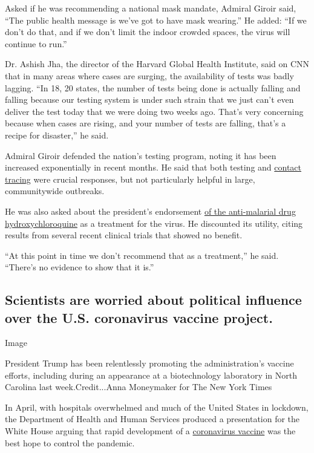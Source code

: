 Asked if he was recommending a national mask mandate, Admiral Giroir
said, ``The public health message is we've got to have mask wearing.''
He added: ``If we don't do that, and if we don't limit the indoor
crowded spaces, the virus will continue to run.''

Dr. Ashish Jha, the director of the Harvard Global Health Institute,
said on CNN that in many areas where cases are surging, the availability
of tests was badly lagging. ``In 18, 20 states, the number of tests
being done is actually falling and falling because our testing system is
under such strain that we just can't even deliver the test today that we
were doing two weeks ago. That's very concerning because when cases are
rising, and your number of tests are falling, that's a recipe for
disaster,'' he said.

Admiral Giroir defended the nation's testing program, noting it has been
increased exponentially in recent months. He said that both testing and
\href{https://www.nytimes3xbfgragh.onion/2020/07/31/health/covid-contact-tracing-tests.html}{contact
tracing} were crucial responses, but not particularly helpful in large,
communitywide outbreaks.

He was also asked about the president's endorsement
\href{https://www.nytimes3xbfgragh.onion/2020/07/28/technology/virus-video-trump.html}{of
the anti-malarial drug hydroxychloroquine} as a treatment for the virus.
He discounted its utility, citing results from several recent clinical
trials that showed no benefit.

``At this point in time we don't recommend that as a treatment,'' he
said. ``There's no evidence to show that it is.''

\hypertarget{scientists-are-worried-about-political-influence-over-the-us-coronavirus-vaccine-project}{%
\subsection{Scientists are worried about political influence over the
U.S. coronavirus vaccine
project.}\label{scientists-are-worried-about-political-influence-over-the-us-coronavirus-vaccine-project}}

Image

President Trump has been relentlessly promoting the administration's
vaccine efforts, including during an appearance at a biotechnology
laboratory in North Carolina last week.Credit...Anna Moneymaker for The
New York Times

In April, with hospitals overwhelmed and much of the United States in
lockdown, the Department of Health and Human Services produced a
presentation for the White House arguing that rapid development of a
\href{https://www.nytimes3xbfgragh.onion/interactive/2020/science/coronavirus-vaccine-tracker.html}{coronavirus
vaccine} was the best hope to control the pandemic.

